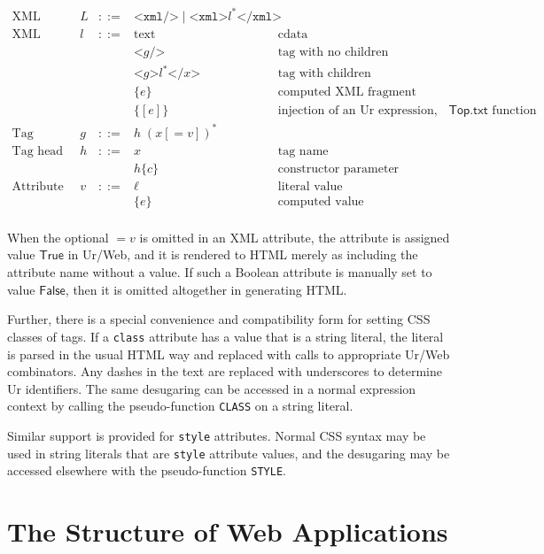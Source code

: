 \documentclass{article}
\newcommand{\cd}[1]{\texttt{#1}}
\newcommand{\mt}[1]{\mathsf{#1}}
\begin{document}
$$\begin{array}{rrcll}
  \textrm{XML fragments} & L &::=& \texttt{<xml/>} \mid \texttt{<xml>}l^*\texttt{</xml>} \\
  \textrm{XML pieces} & l &::=& \textrm{text} & \textrm{cdata} \\
  &&& \texttt{<}g\texttt{/>} & \textrm{tag with no children} \\
  &&& \texttt{<}g\texttt{>}l^*\texttt{</}x\texttt{>} & \textrm{tag with children} \\
  &&& \{e\} & \textrm{computed XML fragment} \\
  &&& \{[e]\} & \textrm{injection of an Ur expression, via the $\mt{Top}.\mt{txt}$ function} \\
  \textrm{Tag} & g &::=& h \; (x [= v])^* \\
  \textrm{Tag head} & h &::=& x & \textrm{tag name} \\
  &&& h\{c\} & \textrm{constructor parameter} \\
  \textrm{Attribute value} & v &::=& \ell & \textrm{literal value} \\
  &&& \{e\} & \textrm{computed value} \\
\end{array}$$

When the optional $= v$ is omitted in an XML attribute, the attribute is assigned value $\mt{True}$ in Ur/Web, and it is rendered to HTML merely as including the attribute name without a value.  If such a Boolean attribute is manually set to value $\mt{False}$, then it is omitted altogether in generating HTML.

Further, there is a special convenience and compatibility form for setting CSS classes of tags.  If a \cd{class} attribute has a value that is a string literal, the literal is parsed in the usual HTML way and replaced with calls to appropriate Ur/Web combinators.  Any dashes in the text are replaced with underscores to determine Ur identifiers.  The same desugaring can be accessed in a normal expression context by calling the pseudo-function \cd{CLASS} on a string literal.

Similar support is provided for \cd{style} attributes.  Normal CSS syntax may be used in string literals that are \cd{style} attribute values, and the desugaring may be accessed elsewhere with the pseudo-function \cd{STYLE}.

\section{\label{structure}The Structure of Web Applications}
\end{document}
